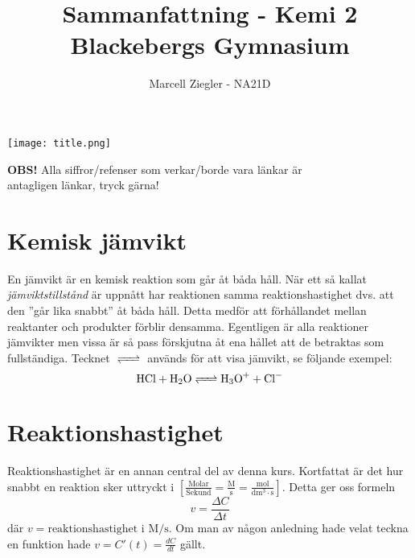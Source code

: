 \documentclass[12pt]{article}
\title{Sammanfattning - Kemi 2 \\ Blackebergs Gymnasium}
\author{Marcell Ziegler - NA21D}
\theoremstyle{definition}
\begin{document}
    \begin{titlepage}
        \maketitle
        \vfill
        \begin{center}
            \texttt{[image: title.png]}
        \end{center}
        \vfill
        \begin{center}
            \textbf{OBS!} Alla siffror/refenser som verkar/borde vara länkar är \\ antagligen länkar, tryck gärna!
        \end{center}
    \end{titlepage}

    \tableofcontents

    \newpage

    \part{Kemisk jämvikt}
    
    En jämvikt är en kemisk reaktion som går åt båda håll. När ett så kallat \emph{jämviktstillstånd} är uppnått har reaktionen samma reaktionshastighet dvs. att den ''går lika snabbt'' åt båda håll. Detta medför att förhållandet mellan reaktanter och produkter förblir densamma. Egentligen är alla reaktioner jämvikter men vissa är så pass förskjutna åt ena hållet att de betraktas som fullständiga. Tecknet $\ce{<=>}$ används för att visa jämvikt, se följande exempel:
    \begin{equation*}
        \ce{HCl + H2O <=> H3O+ + Cl-}
    \end{equation*}

    
    \setcounter{exm}{0}
    
    \setcounter{exm}{0}

    \newpage

    \part{Reaktionshastighet}

    Reaktionshastighet är en annan central del av denna kurs. Kortfattat är det hur snabbt en reaktion sker uttryckt i $\mathrm{\left[\frac{Molar}{Sekund} = \frac{M}{s} = \frac{mol}{dm^3 \cdot s}\right]}$. Detta ger oss formeln 
    \begin{equation*}
        v = \frac{\Delta C}{\Delta t} 
    \end{equation*}
    där $v = \text{reaktionshastighet i } \mathrm{M/s}$. Om man av någon anledning hade velat teckna en funktion hade $v = C'(t) = \frac{dC}{dt}$ gällt.
\end{document}
